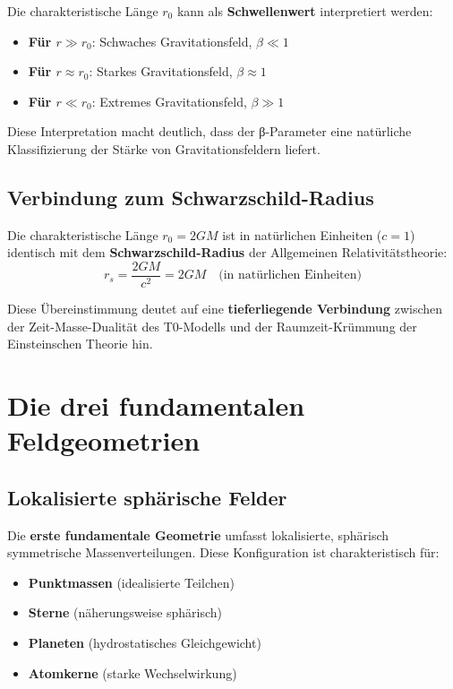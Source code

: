 \documentclass[12pt,a4paper]{report}
\begin{document}
Die charakteristische Länge $r_0$ kann als \textbf{Schwellenwert} interpretiert werden:
\begin{itemize}
	\item \textbf{Für $r \gg r_0$}: Schwaches Gravitationsfeld, $\beta \ll 1$
	\item \textbf{Für $r \approx r_0$}: Starkes Gravitationsfeld, $\beta \approx 1$
	\item \textbf{Für $r \ll r_0$}: Extremes Gravitationsfeld, $\beta \gg 1$
\end{itemize}

Diese Interpretation macht deutlich, dass der β-Parameter eine natürliche Klassifizierung der Stärke von Gravitationsfeldern liefert.

\subsection{Verbindung zum Schwarzschild-Radius}

Die charakteristische Länge $r_0 = 2GM$ ist in natürlichen Einheiten ($c = 1$) identisch mit dem \textbf{Schwarzschild-Radius} der Allgemeinen Relativitätstheorie:
\begin{equation}
	r_s = \frac{2GM}{c^2} = 2GM \quad \text{(in natürlichen Einheiten)}
\end{equation}

Diese Übereinstimmung deutet auf eine \textbf{tieferliegende Verbindung} zwischen der Zeit-Masse-Dualität des T0-Modells und der Raumzeit-Krümmung der Einsteinschen Theorie hin.

\section{Die drei fundamentalen Feldgeometrien}

\subsection{Lokalisierte sphärische Felder}

Die \textbf{erste fundamentale Geometrie} umfasst lokalisierte, sphärisch symmetrische Massenverteilungen. Diese Konfiguration ist charakteristisch für:
\begin{itemize}
	\item \textbf{Punktmassen} (idealisierte Teilchen)
	\item \textbf{Sterne} (näherungsweise sphärisch)
	\item \textbf{Planeten} (hydrostatisches Gleichgewicht)
	\item \textbf{Atomkerne} (starke Wechselwirkung)
\end{itemize}
\end{document}
